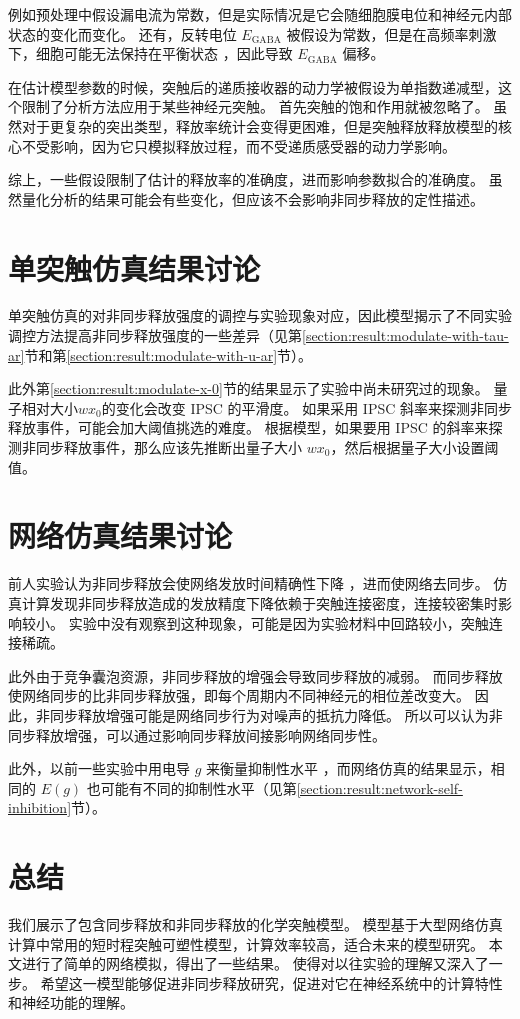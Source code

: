 例如预处理中假设漏电流为常数，但是实际情况是它会随细胞膜电位和神经元内部状态的变化而变化。
还有，反转电位 $E_\text{GABA}$ 被假设为常数，但是在高频率刺激下，细胞可能无法保持在平衡状态 \cite{Staley1995}，因此导致 $E_\text{GABA}$ 偏移。

在估计模型参数的时候，突触后的递质接收器的动力学被假设为单指数递减型，这个限制了分析方法应用于某些神经元突触。
首先突触的饱和作用就被忽略了。
虽然对于更复杂的突出类型，释放率统计会变得更困难，但是突触释放释放模型的核心不受影响，因为它只模拟释放过程，而不受递质感受器的动力学影响。

综上，一些假设限制了估计的释放率的准确度，进而影响参数拟合的准确度。
虽然量化分析的结果可能会有些变化，但应该不会影响非同步释放的定性描述。

\section{单突触仿真结果讨论}
\label{section:discussion:synapse-simulation}
单突触仿真的对非同步释放强度的调控与实验现象对应，因此模型揭示了不同实验调控方法提高非同步释放强度的一些差异（见第\ref{section:result:modulate-with-tau-ar}节和第\ref{section:result:modulate-with-u-ar}节）。

此外第\ref{section:result:modulate-x-0}节的结果显示了实验中尚未研究过的现象。
量子相对大小$wx_0$的变化会改变 IPSC 的平滑度。
如果采用 IPSC 斜率来探测非同步释放事件，可能会加大阈值挑选的难度。
根据模型，如果要用 IPSC 的斜率来探测非同步释放事件，那么应该先推断出量子大小 $wx_0$，然后根据量子大小设置阈值。

\section{网络仿真结果讨论}
\label{section:discussion:network-simulation}
前人实验认为非同步释放会使网络发放时间精确性下降 \cite{Manseau2010}，进而使网络去同步。
仿真计算发现非同步释放造成的发放精度下降依赖于突触连接密度，连接较密集时影响较小。
实验中没有观察到这种现象，可能是因为实验材料中回路较小，突触连接稀疏。

此外由于竞争囊泡资源，非同步释放的增强会导致同步释放的减弱。
而同步释放使网络同步的比非同步释放强，即每个周期内不同神经元的相位差改变大。
因此，非同步释放增强可能是网络同步行为对噪声的抵抗力降低。
所以可以认为非同步释放增强，可以通过影响同步释放间接影响网络同步性。

此外，以前一些实验中用电导 $g$ 来衡量抑制性水平 \cite{Wang1996,Voegtlin2007}，而网络仿真的结果显示，相同的 $E(g)$ 也可能有不同的抑制性水平（见第\ref{section:result:network-self-inhibition}节）。

\section{总结}
我们展示了包含同步释放和非同步释放的化学突触模型。
模型基于大型网络仿真计算中常用的短时程突触可塑性模型，计算效率较高，适合未来的模型研究。
本文进行了简单的网络模拟，得出了一些结果。
使得对以往实验的理解又深入了一步。
希望这一模型能够促进非同步释放研究，促进对它在神经系统中的计算特性和神经功能的理解。
